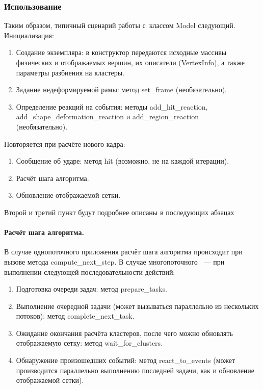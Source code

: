 \documentclass[a4paper, 14pt, titlepage]{extarticle}
\begin{document}
      \subsubsection{Использование}\label{sssec:usage}

        Таким образом, типичный сценарий работы с~классом Model следующий. Инициализация:
        \begin{enumerate}
          \item Создание экземпляра: в конструктор передаются исходные массивы физических и
          отображаемых вершин, их описатели (VertexInfo), а также параметры разбиения на кластеры.
          \item Задание недеформируемой рамы: метод set\_frame (необязательно).
          \item Определение реакций на события: методы add\_hit\_reaction,\\
          add\_shape\_deformation\_reaction и add\_region\_reaction\\
          (необязательно).
        \end{enumerate}
        Повторяется при расчёте нового кадра:
        \begin{enumerate}
          \item Сообщение об ударе: метод hit (возможно, не на каждой итерации).
          \item Расчёт шага алгоритма.
          \item Обновление отображаемой сетки.
        \end{enumerate}
        Второй и третий пункт будут подробнее описаны в последующих абзацах

        \paragraph{Расчёт шага алгоритма.}
        В случае однопоточного приложения расчёт шага алгоритма происходит при вызове метода
        compute\_next\_step. В случае многопоточного ~--- при выполнении следующей
        последовательности действий:
        \begin{enumerate}
          \item Подготовка очереди задач: метод prepare\_tasks.
          \item Выполнение очередной задачи (может вызываться параллельно из нескольких потоков): метод complete\_next\_task.
          \item Ожидание окончания расчёта кластеров, после чего можно
            обновлять отображаемую сетку: метод wait\_for\_clusters.
          \item Обнаружение произошедших событий: метод
            react\_to\_events (может производится параллельно выполнению последней задачи,
            как и обновление отображаемой сетки).
        \end{enumerate}
\end{document}
